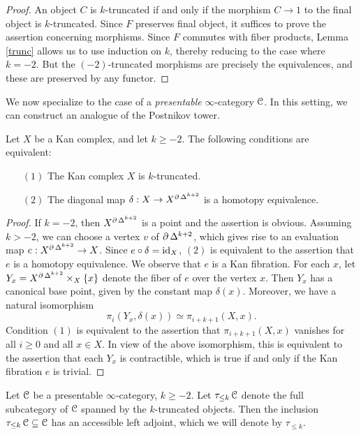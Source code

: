\begin{proof}
An object $C$ is $k$-truncated if and only if the morphism $C
\rightarrow 1$ to the final object is $k$-truncated. Since $F$
preserves final object, it suffices to prove the assertion
concerning morphisms. Since $F$ commutes with fiber products,
Lemma \ref{trunc} allows us to use induction on $k$, thereby
reducing to the case where $k=-2$. But the $(-2)$-truncated
morphisms are precisely the equivalences, and these are preserved
by any functor.
\end{proof}

We now specialize to the case of a {\em presentable} $\infty$-category $\operatorname{\mathcal{C}}$. In this setting, we can construct an analogue of the Postnikov tower.

\begin{lemma}\label{slurm}
Let $X$ be a Kan complex, and let $k \geq -2$. The following conditions are equivalent:
\begin{itemize}
\item[$(1)$] The Kan complex $X$ is $k$-truncated.
\item[$(2)$] The diagonal map $\delta: X \rightarrow X^{ \operatorname{\partial} \Delta^{k+2} }$ is a homotopy equivalence.
\end{itemize}
\end{lemma}

\begin{proof}
If $k=-2$, then $X^{ \operatorname{\partial} \Delta^{k+2} }$ is a point and the assertion is obvious. Assuming $k > -2$,
we can choose a vertex $v$ of $\operatorname{\partial} \Delta^{k+2}$, which gives rise to an evaluation map
$e: X^{ \operatorname{\partial} \Delta^{k+2} } \rightarrow X$. Since $e \circ \delta = \operatorname{id}_{X}$, $(2)$ is equivalent
to the assertion that $e$ is a homotopy equivalence. We observe that $e$ is a Kan fibration. For each $x$, let $Y_{x} = X^{ \operatorname{\partial} \Delta^{k+2} } \times_{X} \{x\}$ denote the fiber of $e$ over the vertex $x$. Then $Y_x$ has a canonical base point, given by the constant map
$\delta(x)$. Moreover, we have a natural isomorphism
$$ \pi_{i}(Y_x, \delta(x) ) \simeq \pi_{i+k+1}(X,x).$$
Condition $(1)$ is equivalent to the assertion that $\pi_{i+k+1}(X,x)$ vanishes for
all $i \geq 0$ and all $x \in X$. In view of the above isomorphism, this is equivalent to the assertion that each $Y_{x}$ is contractible, which is true if and only if the Kan fibration $e$ is trivial.
\end{proof}

\begin{proposition}\label{maketrunc}
Let $\operatorname{\mathcal{C}}$ be a presentable $\infty$-category, $k \geq -2$. Let $\tau_{\leq k} \operatorname{\mathcal{C}}$
denote the full subcategory of $\operatorname{\mathcal{C}}$ spanned by the $k$-truncated objects.
Then the inclusion $\tau_{\leq k} \operatorname{\mathcal{C}} \subseteq \operatorname{\mathcal{C}}$ has an accessible left adjoint, which we will denote by $\tau_{\leq k}$.
\end{proposition}

